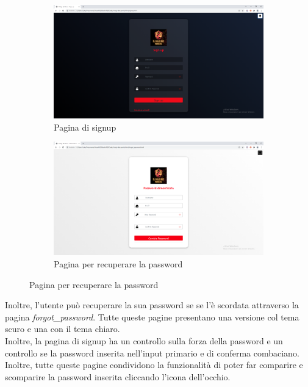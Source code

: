 \documentclass[a4paper,12pt]{report}
\begin{document}
	\begin{figure}[H]
		\begin{subfigure}{.6\textwidth}
			\centering
			\includegraphics[width=1\linewidth]{./Images/Signup.png}
			\caption{Pagina di signup}
			\label{fig:signup}
		\end{subfigure}
		\begin{subfigure}{.6\textwidth}
			\centering
			\includegraphics[width=1\linewidth]{./Images/Forgot_password.png}
			\caption{Pagina per recuperare la password}
			\label{fig:forgot-password}
		\end{subfigure}
		\label{fig:}
	\end{figure}

	\textsf{\small Inoltre, l'utente può recuperare la sua password se se l'è scordata attraverso la pagina \emph{forgot\_password}.}
	\textsf{\small Tutte queste pagine presentano una versione col tema scuro e una con il tema chiaro.}\\
	
	\textsf{\small Inoltre, la pagina di signup ha un controllo sulla forza della password e un controllo se la password inserita nell'input primario e di conferma combaciano.}\\
	\textsf{\small Inoltre, tutte queste pagine condividono la funzionalità di poter far comparire e scomparire la password inserita cliccando l'icona dell'occhio.}\\
	
\end{document}
